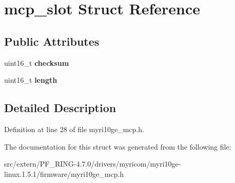 \hypertarget{structmcp__slot}{
\section{mcp\_\-slot Struct Reference}
\label{structmcp__slot}
}
\subsection*{Public Attributes}
\begin{DoxyCompactItemize}
\item 
\hypertarget{structmcp__slot_a520cea742dc9971ec6b6ce1eecdee512}{
uint16\_\-t {\bfseries checksum}}
\label{structmcp__slot_a520cea742dc9971ec6b6ce1eecdee512}

\item 
\hypertarget{structmcp__slot_a0648c3ced05361b04a0e94ab2806ae9f}{
uint16\_\-t {\bfseries length}}
\label{structmcp__slot_a0648c3ced05361b04a0e94ab2806ae9f}

\end{DoxyCompactItemize}


\subsection{Detailed Description}


Definition at line 28 of file myri10ge\_\-mcp.h.



The documentation for this struct was generated from the following file:\begin{DoxyCompactItemize}
\item 
src/extern/PF\_\-RING-\/4.7.0/drivers/myricom/myri10ge-\/linux.1.5.1/firmware/myri10ge\_\-mcp.h\end{DoxyCompactItemize}
